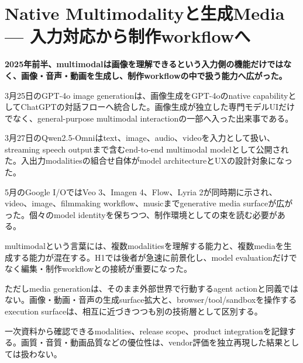 \section{Native Multimodalityと生成Media — 入力対応から制作workflowへ}
\noindent\textbf{2025年前半、multimodalは画像を理解できるという入力側の機能だけではなく、画像・音声・動画を生成し、制作workflowの中で扱う能力へ広がった。}\autocite{src-877e7da88408,src-de4ffd746276,src-e68f8ce96685}

3月25日のGPT-4o image generationは、画像生成をGPT-4oのnative capabilityとしてChatGPTの対話フローへ統合した。画像生成が独立した専門モデルUIだけでなく、general-purpose multimodal interactionの一部へ入った出来事である。\autocite{src-877e7da88408}


3月27日のQwen2.5-Omniはtext、image、audio、videoを入力として扱い、streaming speech outputまで含むend-to-end multimodal modelとして公開された。入出力modalitiesの組合せ自体がmodel architectureとUXの設計対象になった。\autocite{src-de4ffd746276}


5月のGoogle I/OではVeo 3、Imagen 4、Flow、Lyria 2が同時期に示され、video、image、filmmaking workflow、musicまでgenerative media surfaceが広がった。個々のmodel identityを保ちつつ、制作環境としての束を読む必要がある。\autocite{src-e68f8ce96685}


multimodalという言葉には、複数modalitiesを理解する能力と、複数mediaを生成する能力が混在する。H1では後者が急速に前景化し、model evaluationだけでなく編集・制作workflowとの接続が重要になった。\autocite{src-877e7da88408,src-de4ffd746276,src-e68f8ce96685}


ただしmedia generationは、そのまま外部世界で行動するagent actionと同義ではない。画像・動画・音声の生成surface拡大と、browser/tool/sandboxを操作するexecution surfaceは、相互に近づきつつも別の技術層として区別する。\autocite{src-877e7da88408,src-e68f8ce96685}


\begin{claimboundary}
一次資料から確認できるmodalities、release scope、product integrationを記録する。画質・音質・動画品質などの優位性は、vendor評価を独立再現した結果としては扱わない。
\end{claimboundary}
